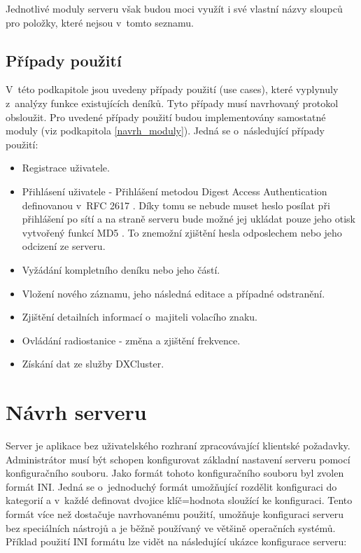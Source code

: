 Jednotlivé moduly serveru však budou moci využít i své vlastní názvy sloupců pro položky, které nejsou v~tomto seznamu.

\subsection{Případy použití}


V~této podkapitole jsou uvedeny případy použití (use cases), které vyplynuly
z~analýzy funkce existujících deníků. Tyto případy musí
navrhovaný protokol obsloužit. Pro uvedené případy použití
budou implementovány samostatné moduly (viz podkapitola \ref{navrh_moduly}).
Jedná se o~následující případy použití:

\begin{itemize}
\item Registrace uživatele.
\item Přihlásení uživatele - Přihlášení metodou Digest Access Authentication definovanou
v~RFC 2617 \cite{rfc2617}. 
Díky tomu se nebude muset heslo posílat při přihlášení po sítí %
a na straně serveru bude možné jej ukládat
pouze jeho otisk vytvořený funkcí MD5 \cite{md5}. To znemožní zjištění hesla odposlechem nebo jeho odcizení ze
serveru.
\item Vyžádání kompletního deníku nebo jeho částí.
\item Vložení nového záznamu, jeho následná editace a případné odstranění.
\item Zjištění detailních informací o~majiteli volacího znaku.
\item Ovládání radiostanice - změna a zjištění frekvence.
\item Získání dat ze služby DXCluster.
\end{itemize}

\section{Návrh serveru}
\label{navrh_server}

Server je aplikace bez uživatelského rozhraní %
zpracovávající klientské požadavky. Administrátor musí být schopen konfigurovat základní nastavení serveru
pomocí konfiguračního souboru. Jako formát tohoto konfiguračního souboru byl zvolen formát INI.
Jedná se o~jednoduchý formát umožňující rozdělit konfiguraci do kategorií
a v~každé definovat dvojice klíč=hodnota sloužící ke konfiguraci. Tento formát více než dostačuje 
navrhovanému použití, umožňuje konfiguraci serveru bez speciálních nástrojů a je běžně používaný
ve většině operačních systémů.
Příklad použití INI formátu lze vidět na následující
ukázce konfigurace serveru:

